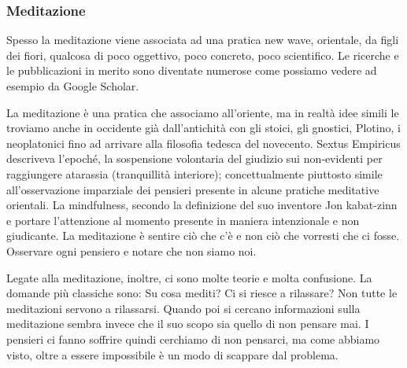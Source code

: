 \documentclass[12pt]{book} %
\begin{document}
\subsubsection{Meditazione}
Spesso la meditazione viene associata
ad una pratica new wave, orientale, da figli dei fiori, qualcosa di poco oggettivo, poco concreto, poco scientifico. Le
ricerche e le pubblicazioni in merito sono diventate numerose come possiamo vedere ad esempio da Google Scholar.

La meditazione è una pratica che associamo all'oriente, ma in realtà idee simili le troviamo anche in occidente già dall'antichità con gli stoici, gli
gnostici, Plotino, i neoplatonici fino ad arrivare alla filosofia tedesca del novecento. Sextus Empiricus descriveva l’epoché, la sospensione volontaria del giudizio sui non‑evidenti per raggiungere atarassia (tranquillità interiore); concettualmente piuttosto simile all’osservazione imparziale dei pensieri presente in alcune pratiche meditative orientali. La mindfulness, secondo la definizione del suo inventore Jon kabat-zinn e portare l'attenzione al momento presente in maniera intenzionale e non giudicante.
La meditazione è sentire ciò che c'è e non ciò che vorresti che ci fosse. Osservare ogni pensiero e notare che non siamo noi.

Legate alla meditazione, inoltre, ci sono molte teorie e molta confusione. La domande più classiche sono: Su cosa mediti? Ci si riesce a rilassare?
Non tutte le meditazioni servono a rilassarsi. 
Quando poi si cercano informazioni sulla meditazione sembra invece che il suo scopo sia quello di non pensare mai. 
I pensieri ci fanno soffrire quindi cerchiamo di non pensarci, ma come abbiamo visto, oltre a essere impossibile è un modo di scappare dal problema.
\end{document}
